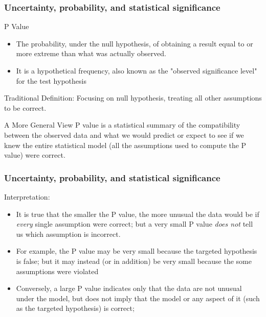 \documentclass{beamer}
\begin{document}
\begin{frame}
\frametitle{Uncertainty, probability, and statistical significance}

\begin{block}{P Value}
\begin{itemize}
\item The probability, under the null hypothesis, of obtaining a result equal to or more extreme than what was actually observed. 
 \item It is a hypothetical frequency, also known as the "observed significance level" for the test hypothesis
\end{itemize}
\end{block}
\pause
\begin{block}{Traditional Definition:}
Focusing on null hypothesis, treating all other assumptions to be correct. 
\end{block}
\pause
\begin{block}{A More General View}
P value is  a statistical summary of the compatibility
between the observed data and what we would predict or
expect to see if we knew the entire statistical model (all the
assumptions used to compute the P value) were correct.
\end{block}
\end{frame}


\begin{frame}
\frametitle{Uncertainty, probability, and statistical significance}


\begin{block}{Interpretation:}
\begin{itemize}

 \item<1-> It is true that the smaller the P value, the more unusual
the data would be if \textit{every} single assumption were correct;
but a very small P value \textit{does not} tell us which assumption
is incorrect. 
\item<2-> For example, the P value may be very small
because the targeted hypothesis is false; but it may instead
(or in addition) be very small because the some assumptions
were violated

 \item<3-> Conversely, a large P value indicates
only that the data are not unusual under the model,
but does not imply that the model or any aspect of it (such
as the targeted hypothesis) is correct;
\end{itemize}
\end{block}

\end{frame}
\end{document}

